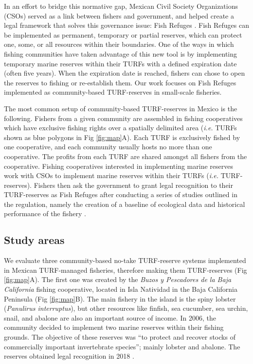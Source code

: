 \documentclass{frontiersSCNS}
\begin{document}
In an effort to bridge this normative gap, Mexican Civil Society Organizations (CSOs) served as a link between fishers and government, and helped create a legal framework that solves this governance issue: Fish Refuges \citep{nom}. Fish Refuges can be implemented as permanent, temporary or partial reserves, which can protect one, some, or all resources within their boundaries. One of the ways in which fishing communities have taken advantage of this new tool is by implementing temporary marine reserves within their TURFs with a defined expiration date (often five years). When the expiration date is reached, fishers can chose to open the reserves to fishing or re-establish them. Our work focuses on Fish Refuges implemented as community-based TURF-reserves in small-scale fisheries.

The most common setup of community-based TURF-reserves in Mexico is the following. Fishers from a given community are assembled in fishing cooperatives which have exclusive fishing rights over a spatially delimited area (\emph{i.e.} TURFs shown as blue polygons in Fig \ref{fig:map}A). Each TURF is exclusively fished by one cooperative, and each community usually hosts no more than one cooperative. The profits from each TURF are shared amongst all fishers from the cooperative. Fishing cooperatives interested in implementing marine reserves work with CSOs to implement marine reserves within their TURFs (\emph{i.e.} TURF-reserves). Fishers then ask the government to grant legal recognition to their TURF-reserves as Fish Refuges after conducting a series of studies outlined in the regulation, namely the creation of a baseline of ecological data and historical performance of the fishery \citep{nom}.

\hypertarget{study-areas}{%
\subsection{Study areas}\label{study-areas}}

We evaluate three community-based no-take TURF-reserve systems implemented in Mexican TURF-managed fisheries, therefore making them TURF-reserves (Fig \ref{fig:map}A). The first one was created by the \emph{Buzos y Pescadores de la Baja California} fishing cooperative, located in Isla Natividad in the Baja California Peninsula (Fig \ref{fig:map}B). The main fishery in the island is the spiny lobster (\emph{Panulirus interruptus}), but other resources like finfish, sea cucumber, sea urchin, snail, and abalone are also an important source of income. In 2006, the community decided to implement two marine reserves within their fishing grounds. The objective of these reserves was ``to protect and recover stocks of commercially important invertebrate species''; mainly lobster and abalone. The reserves obtained legal recognition in 2018 \citep{dof_website_2018}.
\end{document}
